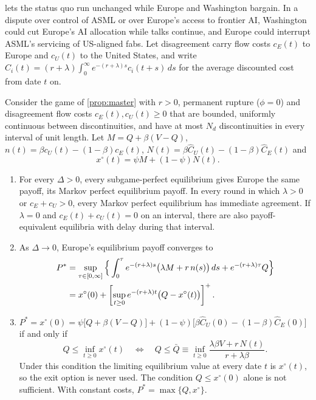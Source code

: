  lets the status quo run unchanged while Europe and Washington bargain. In a dispute over control of ASML or over Europe's access to frontier AI, Washington could cut Europe's AI allocation while talks continue, and Europe could interrupt ASML's servicing of US-aligned fabs. Let disagreement carry flow costs $c_E(t)$ to Europe and $c_U(t)$ to the United States, and write $\hat C_i(t)=(r+\lambda)\int_0^\infty e^{-(r+\lambda)s}c_i(t+s)\,ds$ for the average discounted cost from date $t$ on.

\begin{proposition}\label{prop:pain}
Consider the game of \cref{prop:master} with $r>0$, permanent rupture ($\phi=0$) and disagreement flow costs $c_E(t),c_U(t)\ge0$ that are bounded, uniformly continuous between discontinuities, and have at most $N_d$ discontinuities in every interval of unit length. Let $M=Q+\beta(V-Q)$, $n(t)=\beta c_U(t)-(1-\beta)c_E(t)$, $N(t)=\beta\hat C_U(t)-(1-\beta)\hat C_E(t)$ and
\[
x^\circ(t)=\psi M+(1-\psi)N(t).
\]
\begin{enumerate}[label=(\roman*)]
\item For every $\Delta>0$, every subgame-perfect equilibrium gives Europe the same payoff, its Markov perfect equilibrium payoff. In every round in which $\lambda>0$ or $c_E+c_U>0$, every Markov perfect equilibrium has immediate agreement. If $\lambda=0$ and $c_E(t)+c_U(t)=0$ on an interval, there are also payoff-equivalent equilibria with delay during that interval.
\item As $\Delta\to0$, Europe's equilibrium payoff converges to
\begin{align*}
P^*&=\sup_{\tau\in[0,\infty]}\Big\{\int_0^\tau e^{-(r+\lambda)s}\big(\lambda M+r\,n(s)\big)\,ds+e^{-(r+\lambda)\tau}Q\Big\}\\
&=x^\circ(0)+\left[\sup_{t\ge0}e^{-(r+\lambda)t}\big(Q-x^\circ(t)\big)\right]^{+}.
\end{align*}
\item $P^*=x^\circ(0)=\psi\big[Q+\beta(V-Q)\big]+(1-\psi)\big[\beta\hat C_U(0)-(1-\beta)\hat C_E(0)\big]$ if and only if
\[
Q\le\inf_{t\ge0}x^\circ(t)\quad\Longleftrightarrow\quad Q\le\bar Q\equiv\inf_{t\ge0}\frac{\lambda\beta V+r\,N(t)}{r+\lambda\beta}.
\]
Under this condition the limiting equilibrium value at every date $t$ is $x^\circ(t)$, so the exit option is never used. The condition $Q\le x^\circ(0)$ alone is not sufficient. With constant costs, $P^*=\max\{Q,x^\circ\}$.
\end{enumerate}
\end{proposition}

